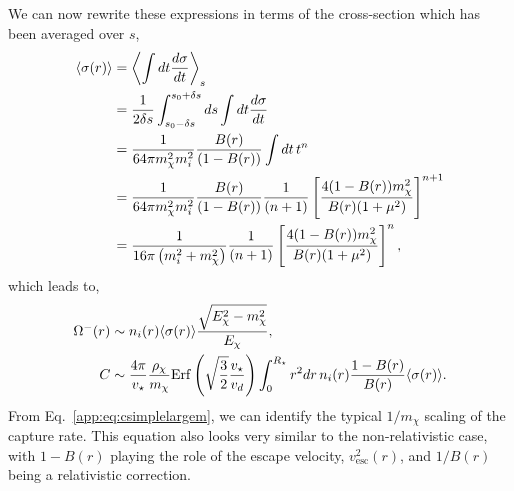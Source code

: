 We can now rewrite these expressions in terms of the cross-section which has been averaged over $s$, 
\begin{align}
\langle\sigma(r)\rangle & =\left\langle\int dt \frac{d\sigma}{dt} \right\rangle_s \\
&= \frac{1}{2\delta s}\int_{s_0-\delta s}^{s_0+\delta s} ds \int dt \frac{d\sigma}{dt} \\
& = \frac{1}{64\pi m_\chi^2 m_i^2} \frac{B(r)}{(1-B(r))}   \int dt \, t^n \\
&= \frac{1}{64\pi m_\chi^2 m_i^2} \frac{B(r)}{(1-B(r))} \frac{1}{(n+1)} \left[\frac{4(1-B(r))m_\chi^2}{B(r)(1+\mu^2)}\right]^{n+1}\\
&= \frac{1}{16\pi \left(m_i^2+m_\chi^2\right)}  \frac{1}{(n+1)} \left[\frac{4(1-B(r))m_\chi^2}{B(r)(1+\mu^2)}\right]^{n}, 
\end{align}
which leads to, 
\begin{align}
\Omega^{-}(r) &\sim n_i(r) \langle\sigma(r)\rangle \frac{\sqrt{E_\chi^2-m_\chi^2}}{E_\chi}, \\
C &\sim \frac{4\pi}{v_\star} \frac{\rho_\chi}{m_\chi}  {\rm Erf}\left(\sqrt{\frac{3}{2}}\frac{v_\star}{v_d}\right)\int_0^{R_\star}  r^2 dr \, n_i(r)  \frac{1-B(r)}{B(r)} \langle\sigma(r)\rangle\label{app:eq:csimplelargem}. 
\end{align}
From Eq.~\ref{app:eq:csimplelargem}, we can identify the typical $1/m_\chi$ scaling of the capture rate. This equation also looks very similar to the non-relativistic case, with $1-B(r)$ playing the role of the escape velocity, $v_\mathrm{esc}^2(r)$, and $1/B(r)$ being a relativistic correction.

